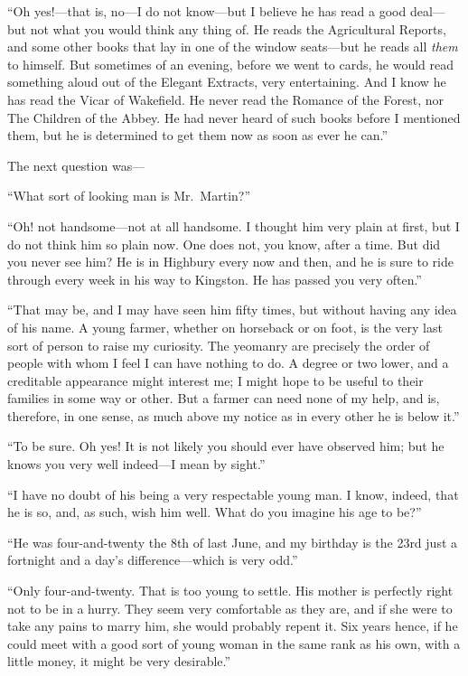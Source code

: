 ``Oh yes!---that is, no---I do not know---but I believe he has
read a good deal---but not what you would think any thing of.
He reads the Agricultural Reports, and some other books that lay
in one of the window seats---but he reads all \emph{them} to himself.
But sometimes of an evening, before we went to cards, he would read
something aloud out of the Elegant Extracts, very entertaining.
And I know he has read the Vicar of Wakefield.  He never read the
Romance of the Forest, nor The Children of the Abbey.  He had never
heard of such books before I mentioned them, but he is determined
to get them now as soon as ever he can.''

The next question was---%

``What sort of looking man is Mr.\ Martin?''

``Oh! not handsome---not at all handsome.  I thought him very plain
at first, but I do not think him so plain now.  One does not, you know,
after a time.  But did you never see him? He is in Highbury every
now and then, and he is sure to ride through every week in his way
to Kingston.  He has passed you very often.''

``That may be, and I may have seen him fifty times, but without
having any idea of his name.  A young farmer, whether on horseback
or on foot, is the very last sort of person to raise my curiosity.
The yeomanry are precisely the order of people with whom I feel I
can have nothing to do.  A degree or two lower, and a creditable
appearance might interest me; I might hope to be useful to their
families in some way or other.  But a farmer can need none of my help,
and is, therefore, in one sense, as much above my notice as in every
other he is below it.''

``To be sure.  Oh yes! It is not likely you should ever have
observed him; but he knows you very well indeed---I mean by sight.''

``I have no doubt of his being a very respectable young man.
I know, indeed, that he is so, and, as such, wish him well.
What do you imagine his age to be?''

``He was four-and-twenty the 8th of last June, and my birthday is
the 23rd just a fortnight and a day's difference---which is very odd.''

``Only four-and-twenty. That is too young to settle.  His mother is
perfectly right not to be in a hurry.  They seem very comfortable
as they are, and if she were to take any pains to marry him,
she would probably repent it.  Six years hence, if he could meet
with a good sort of young woman in the same rank as his own,
with a little money, it might be very desirable.''

